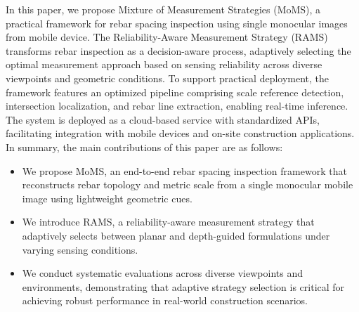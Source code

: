 \documentclass{article}
\begin{document}
In this paper, we propose Mixture of Measurement Strategies (MoMS), a practical framework for rebar spacing inspection using single monocular images from mobile device. The Reliability-Aware Measurement Strategy (RAMS) transforms rebar inspection as a decision-aware process, adaptively selecting the optimal measurement approach based on sensing reliability across diverse viewpoints and geometric conditions. To support practical deployment, the framework features an optimized pipeline comprising scale reference detection, intersection localization, and rebar line extraction, enabling real-time inference. The system is deployed as a cloud-based service with standardized APIs, facilitating integration with mobile devices and on-site construction applications. In summary, the main contributions of this paper are as follows:
\begin{itemize}[leftmargin=*, itemsep=0pt, topsep=0pt]


    \item We propose MoMS, an end-to-end rebar spacing inspection framework that reconstructs rebar topology and metric scale from a single monocular mobile image using lightweight geometric cues.
    \item We introduce RAMS, a reliability-aware measurement strategy that adaptively selects between planar and depth-guided formulations under varying sensing conditions.
    \item We conduct systematic evaluations across diverse viewpoints and environments, demonstrating that adaptive strategy selection is critical for achieving robust performance in real-world construction scenarios.
\end{itemize}
\end{document}
